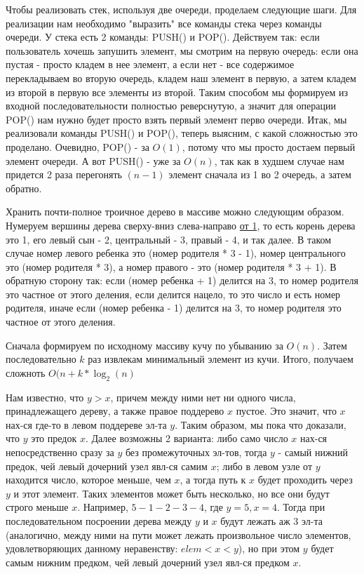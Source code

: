 \documentclass[12pt]{extreport}
\theoremstyle{definition}
\theoremstyle{definition}
\begin{document}
\Pr \hspace{1mm} Чтобы реализовать стек, используя две очереди, проделаем следующие шаги. Для реализации нам необходимо "выразить" все команды стека через команды очереди. У стека есть 2 команды: PUSH() и POP(). Действуем так: если пользователь хочешь запушить элемент, мы смотрим на первую очередь: если она пустая - просто кладем в нее элемент, а если нет - все содержимое перекладываем во вторую очередь, кладем наш элемент в первую, а затем кладем из второй в первую все элементы из второй. Таким способом мы формируем из входной последовательности полностью реверснутую, а значит для операции POP() нам нужно будет просто взять первый элемент перво очереди. Итак, мы реализовали команды PUSH() и POP(), теперь выясним, с какой сложностью это проделано. Очевидно, POP() - за $O(1)$, потому что мы просто достаем первый элемент очереди. А вот PUSH() - уже за $O(n)$, так как в худшем случае нам придется 2 раза перегонять $(n - 1)$ элемент сначала из 1 во 2 очередь, а затем обратно.

\Pr \hspace{1mm} Хранить почти-полное троичное дерево в массиве можно следующим образом. Нумеруем вершины дерева сверху-вниз слева-направо \underline{от 1}, то есть корень дерева это 1, его левый сын - 2, центральный - 3, правый - 4, и так далее. В таком случае номер левого ребенка это (номер родителя * 3 - 1), номер центрального это (номер родителя * 3), а номер правого - это (номер родителя * 3 + 1). В обратную сторону так: если (номер ребенка + 1) делится на 3, то номер родителя это частное от этого деления, если делится нацело, то это число и есть номер родителя, иначе если (номер ребенка - 1) делится на 3, то номер родителя это частное от этого деления.

\Pr \hspace{1mm} Сначала формируем по исходному массиву кучу по убыванию за $O(n)$. Затем последовательно $k$ раз извлекам минимальный элемент из кучи. Итого, получаем сложноть $O(n + k * \log_2(n)$

\Pr \hspace{1mm} Нам известно, что $y > x$, причем между ними нет ни одного числа, принадлежащего дереву, а также правое поддерево $x$ пустое. Это значит, что $x$ нах-ся где-то в левом поддереве эл-та $y$. Таким образом, мы пока что доказали, что $y$ это предок $x$. Далее возможны 2 варианта: либо само число $x$ нах-ся непосредственно сразу за $y$ без промежуточных эл-тов, тогда $y$ - самый нижний предок, чей левый дочерний узел явл-ся самим $x$; либо в левом узле от $y$ находится число, которое меньше, чем $x$, а тогда путь к $x$ будет проходить через $y$ и этот элемент. Таких элементов может быть несколько, но все они будут строго меньше $x$. Например, $5-1-2-3-4$, где $y = 5, x = 4$. Тогда при последовательном посроении дерева между $y$ и $x$ будут лежать аж 3 эл-та (аналогично, между ними на пути может лежать произвольное число элементов, удовлетворяющих данному неравенству: $elem < x < y$), но при этом $y$ будет самым нижним предком, чей левый дочерний узел явл-ся предком $x$. 
\end{document}
